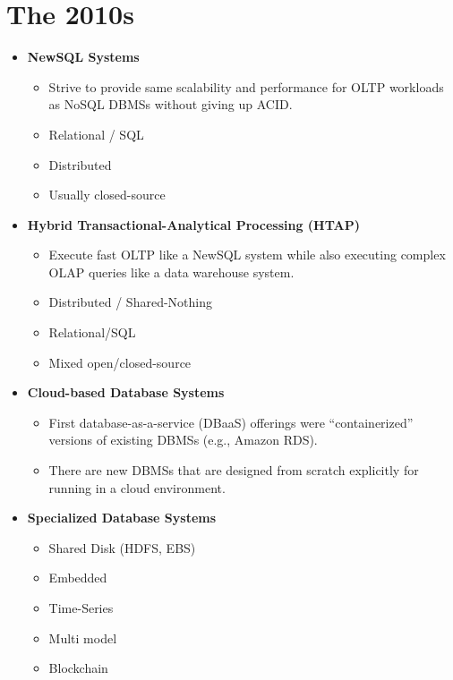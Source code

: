 \documentclass[11pt]{article}
\begin{document}
\section{The 2010s}
\begin{itemize}
    \item
    \textbf{NewSQL Systems}~\cite{aslett11,pavlo16}
    \begin{itemize}
        \item
        Strive to provide same scalability and performance for OLTP workloads as NoSQL DBMSs 
        without giving up ACID.
        \item Relational / SQL
        \item Distributed
        \item Usually closed-source
    \end{itemize}
    
    \item \textbf{Hybrid Transactional-Analytical Processing (HTAP)}~\cite{pezzini14}
    \begin{itemize}
        \item
        Execute fast OLTP like a NewSQL system while also executing complex OLAP queries like 
        a data warehouse system.
        \item Distributed / Shared-Nothing
        \item Relational/SQL
        \item Mixed open/closed-source
    \end{itemize}
    
    \item \textbf{Cloud-based Database Systems}
    \begin{itemize}
        \item
        First database-as-a-service (DBaaS) offerings were ``containerized'' versions of existing 
        DBMSs (e.g., Amazon RDS).
        
        \item
        There are new DBMSs that are designed from scratch explicitly for running in a cloud 
        environment.
    \end{itemize}
    
    \item \textbf{Specialized Database Systems}
    \begin{itemize}
        \item Shared Disk (HDFS, EBS)
        \item Embedded
        \item Time-Series
        \item Multi model
        \item Blockchain
    \end{itemize}
\end{itemize}

\newpage


\end{document}

